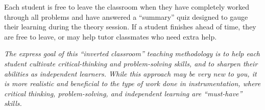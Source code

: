Each student is free to leave the classroom when they have completely worked through all problems and have answered a ``summary'' quiz designed to gauge their learning during the theory session.  If a student finishes ahead of time, they are free to leave, or may help tutor classmates who need extra help.

{\it The express goal of this ``inverted classroom'' teaching methodology is to help each student cultivate critical-thinking and problem-solving skills, and to sharpen their abilities as independent learners.  While this approach may be very new to you, it is more realistic and beneficial to the type of work done in instrumentation, where critical thinking, problem-solving, and independent learning are ``must-have'' skills.}














